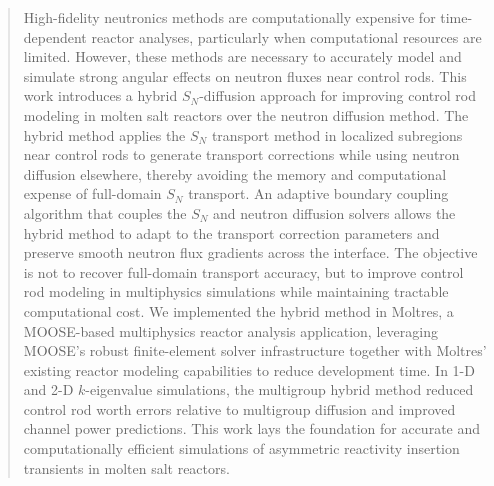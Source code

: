 \begin{abstract}
High-fidelity neutronics methods are computationally expensive for time-dependent reactor analyses,
particularly when computational resources are limited. However, these methods are necessary to
accurately model and simulate strong angular effects on neutron fluxes near control rods.
This work introduces a hybrid $S_N$-diffusion approach for improving control rod modeling in molten
salt reactors over the neutron diffusion method. The hybrid method applies the $S_N$ transport
method in localized subregions near control rods to generate
transport corrections while using neutron diffusion elsewhere, thereby avoiding the memory and
computational expense of full-domain $S_N$ transport.
An adaptive boundary coupling algorithm that couples the $S_N$ and neutron diffusion
solvers allows the hybrid method to adapt to the
transport correction parameters and preserve smooth neutron flux gradients across the interface.
The objective is not to recover full-domain transport accuracy, but to improve control rod modeling
in multiphysics simulations while maintaining tractable computational cost.
We implemented the hybrid method in Moltres, a MOOSE-based multiphysics reactor analysis
application, leveraging MOOSE's robust finite-element solver infrastructure
together with Moltres' existing reactor modeling capabilities to reduce development time.
In 1-D and 2-D $k$-eigenvalue simulations, the multigroup hybrid method reduced control rod worth
errors relative to multigroup diffusion and improved channel power predictions.
This work lays the foundation for accurate and computationally efficient simulations of asymmetric
reactivity insertion transients in molten salt reactors.
\end{abstract}
